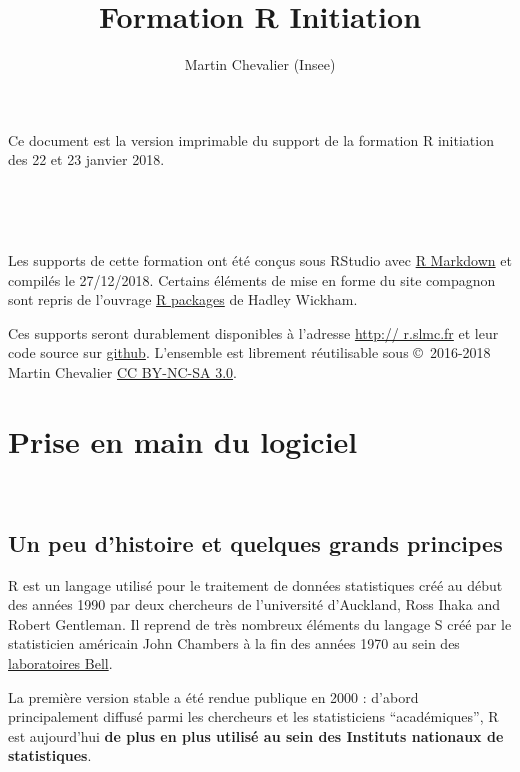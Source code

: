 \documentclass[12pt,twosided, notitlepage]{book}
\title{Formation R Initiation}
\author{Martin Chevalier (Insee)}
\date{}
\makeatletter
\newcommand*{\toccontents}{\@starttoc{toc}}
\newif \ifsol
\makeatother
\begin{document}
\maketitle

\thispagestyle{empty}

Ce document est la version imprimable du support de la formation R
initiation des 22 et 23 janvier 2018.

~

\toccontents

~

Les supports de cette formation ont été conçus sous RStudio avec
\href{http://rmarkdown.rstudio.com/}{R Markdown} et compilés le
27/12/2018. Certains éléments de mise en forme du site compagnon sont
repris de l'ouvrage \href{http://r-pkgs.had.co.nz/}{R packages} de
Hadley Wickham.

Ces supports seront durablement disponibles à l'adresse
\href{http://r.slmc.fr/}{http:// r.slmc.fr} et leur code source sur
\href{https://github.com/martinchevalier/r_insee}{github}. L'ensemble
est librement réutilisable sous ©~2016-2018 Martin Chevalier
\href{https://creativecommons.org/licenses/by-nc-sa/3.0/fr}{CC BY-NC-SA
3.0}.

\renewcommand{\cftsecfont}{\small\bfseries}

\soltrue

\chapter{Prise en main du logiciel}

\minitoc 

~

\section{Un peu d'histoire et quelques grands
principes}\label{un-peu-dhistoire-et-quelques-grands-principes}

R est un langage utilisé pour le traitement de données statistiques créé
au début des années 1990 par deux chercheurs de l'université d'Auckland,
Ross Ihaka and Robert Gentleman. Il reprend de très nombreux éléments du
langage S créé par le statisticien américain John Chambers à la fin des
années 1970 au sein des
\href{https://fr.wikipedia.org/wiki/Laboratoires_Bell}{laboratoires
Bell}.

La première version stable a été rendue publique en 2000 : d'abord
principalement diffusé parmi les chercheurs et les statisticiens
\enquote{académiques}, R est aujourd'hui \textbf{de plus en plus utilisé
au sein des Instituts nationaux de statistiques}.
\end{document}
